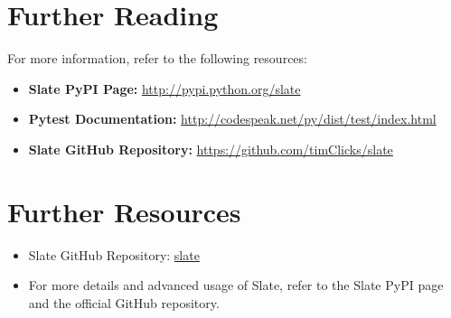 \section{Further Reading}
For more information, refer to the following resources:
\begin{itemize}
	\item \textbf{Slate PyPI Page:} \url{http://pypi.python.org/slate}
	\item \textbf{Pytest Documentation:} \url{http://codespeak.net/py/dist/test/index.html}
	\item \textbf{Slate GitHub Repository:} \url{https://github.com/timClicks/slate}
\end{itemize}

\section{Further Resources}

\begin{itemize}
    \item Slate GitHub Repository: \href{https://github.com/timClicks/slate}{slate}
    \item For more details and advanced usage of Slate, refer to the Slate PyPI page and the official GitHub repository.
\end{itemize}
